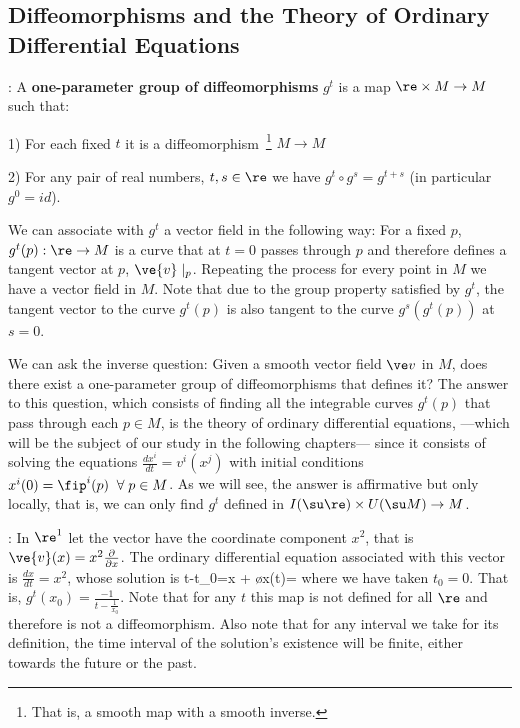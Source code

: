 \subsection{Diffeomorphisms and the Theory of Ordinary Differential Equations}



: A {\bf one-parameter group of diffeomorphisms} $g^t$ is a map
$\re\times M\to M$ such that:

1) For each fixed $t$ it is a diffeomorphism~\footnote{That is, a smooth map with a smooth inverse.} $M\to M$ 

2) For any pair of real numbers, $t,s\in \re$ we have $g^t\circ g^s=g^{t+s}$
(in particular
$g^0=id$).

\espa
We can associate with $g^t$ a vector field in the
following way: For a fixed $p$, $g^t(p):\re\to M$ is a curve
that at $t=0$ passes through $p$ and therefore defines a tangent vector at
$p$, ${\ve{ v}}\mid_p$. Repeating the process for every point in $M$ we have
a vector field in $M$. Note that due to the group property
satisfied by $g^t$, the tangent vector to the curve $g^t(p)$ is also
tangent to the curve $g^s(g^t(p))$ at $s=0$.

We can ask the inverse question: Given a smooth vector field
$\ve v$
in $M$, does there exist a one-parameter group of diffeomorphisms that defines it? The answer to this question, which consists of finding all
the integrable curves $g^t(p)$ that pass through each $p\in M$, is
the theory of ordinary differential equations,
---which will be the subject of our study in the following chapters---
since it consists of solving the
equations $\frac {dx^i}{dt}=v^i(x^j)$ with initial conditions
$x^i(0)=\fip^i(p) \;\;\forall\;p\in M$. As we will see, the answer is
affirmative but only locally, that is, we can only find
$g^t$ defined in $I(\su \re)\times U(\su M)\to M$.

\espa
\ejem: In $\re^1$ let the vector have the coordinate component
$x^2$, that is $\ve{v}(x)=x^2\frac{\partial}{\partial x}$. The ordinary
differential equation associated with this vector is $\frac{dx}{dt}=x^2$, 
whose solution is 
\beq 
t-t_0=x +
\;\mbox{\o}\;\;x(t)=
\eeq
\noi
where we have taken $t_0=0$. That is, $g^t(x_0)=\displaystyle\frac{-1}{t-\frac
1{x_0}}$. Note that for any $t$ this map is not defined for
all $\re$ and therefore is not a diffeomorphism. Also note that for any interval we
take for its definition, the time interval of the solution's existence will be finite, either towards the
future or the past.

